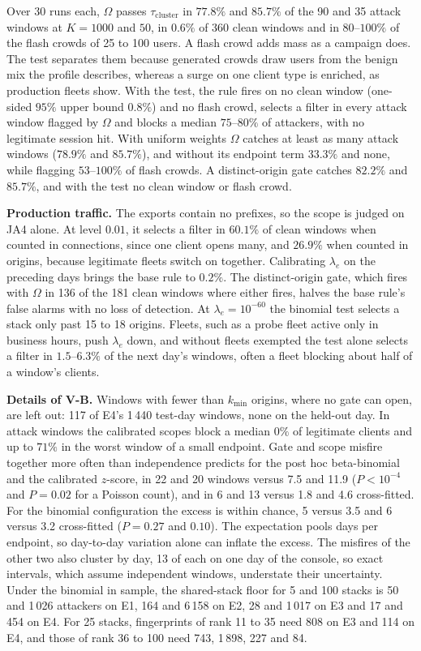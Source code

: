\documentclass[conference,letterpaper,10pt]{IEEEtran}
\newcommand\1{\textit{(i)}}
\newcommand\2{\textit{(ii)}}
\newcommand\3{\textit{(iii)}}
\newcommand\4{\textit{(iv)}}
\newcommand\5{\textit{(v)}}
\newcommand\6{\textit{(vi)}}
\newcommand\7{\textit{(vii)}}
\newcommand\8{\textit{(viii)}}
\newcommand\9{\textit{(ix)}}
\begin{document}
Over 30 runs each, $\Omega$ passes $\tau_{\mathrm{cluster}}$ in $77.8\%$ and $85.7\%$ of the 90 and 35 attack windows at $K = 1000$ and $50$, in $0.6\%$ of 360 clean windows and in $80$--$100\%$ of the flash crowds of 25 to 100 users. A flash crowd adds mass as a campaign does. The test separates them because generated crowds draw users from the benign mix the profile describes, whereas a surge on one client type is enriched, as production fleets show. With the test, the rule fires on no clean window (one-sided $95\%$ upper bound $0.8\%$) and no flash crowd, selects a filter in every attack window flagged by $\Omega$ and blocks a median $75$--$80\%$ of attackers, with no legitimate session hit. With uniform weights $\Omega$ catches at least as many attack windows
($78.9\%$ and $85.7\%$), and without its endpoint term $33.3\%$ and none, while flagging $53$--$100\%$ of flash crowds. A distinct-origin gate catches $82.2\%$ and $85.7\%$, and with the test no clean window or
flash crowd.

\textbf{Production traffic.} The exports contain no prefixes, so the scope is judged on JA4 alone. At level $0.01$, it selects a filter in $60.1\%$ of clean windows when counted in connections, since one client opens many, and $26.9\%$ when counted in origins, because legitimate fleets switch on together. Calibrating $\lambda_e$ on the preceding days brings the base rule to $0.2\%$. The distinct-origin gate, which fires with $\Omega$ in 136 of the 181 clean windows where either fires, halves the base rule's false alarms with no loss of detection. At $\lambda_e = 10^{-60}$ the binomial test selects a stack only past 15 to 18 origins. Fleets, such as a probe fleet active only in business hours, push $\lambda_e$ down, and without fleets exempted the test alone selects a filter in $1.5$--$6.3\%$ of the next day's windows, often a fleet blocking about half of a window's clients.

\textbf{Details of V-B.} Windows with fewer than $k_{\min}$ origins, where no gate can open, are left out: 117 of E4's 1\,440 test-day windows, none on the held-out day. In attack windows the calibrated scopes block a median $0\%$ of legitimate clients and up to $71\%$ in the worst window of a small endpoint. Gate and scope misfire together more often than independence predicts for the post hoc beta-binomial and the calibrated $z$-score, in 22 and 20 windows versus 7.5 and 11.9 ($P < 10^{-4}$ and $P = 0.02$ for a Poisson count), and in 6 and 13 versus 1.8 and 4.6 cross-fitted. For the binomial configuration the excess is within chance, 5 versus 3.5 and 6 versus 3.2 cross-fitted ($P = 0.27$ and $0.10$). The expectation pools days per endpoint, so day-to-day variation alone can inflate the excess. The misfires of the other two also cluster by day, 13 of each on one day of the console, so exact intervals, which assume independent windows, understate their uncertainty. Under the binomial in sample, the shared-stack floor for 5 and 100 stacks is 50 and 1\,026 attackers on E1, 164 and 6\,158 on E2, 28 and 1\,017 on E3 and 17 and 454 on E4. For 25 stacks, fingerprints of rank 11 to 35 need 808 on E3 and 114 on E4, and those of rank 36 to 100 need 743, 1\,898, 227 and 84.
\end{document}
